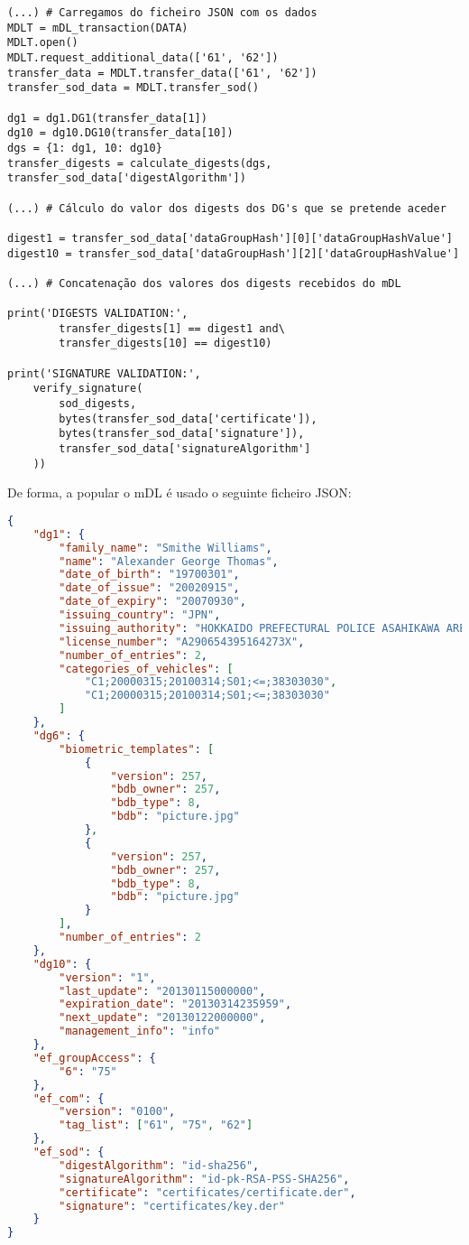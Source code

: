 \begin{Verbatim}[frame=single, framerule=0.5mm]
(...) # Carregamos do ficheiro JSON com os dados
MDLT = mDL_transaction(DATA)
MDLT.open()
MDLT.request_additional_data(['61', '62'])
transfer_data = MDLT.transfer_data(['61', '62'])
transfer_sod_data = MDLT.transfer_sod()

dg1 = dg1.DG1(transfer_data[1])
dg10 = dg10.DG10(transfer_data[10])
dgs = {1: dg1, 10: dg10}
transfer_digests = calculate_digests(dgs, transfer_sod_data['digestAlgorithm'])

(...) # Cálculo do valor dos digests dos DG's que se pretende aceder

digest1 = transfer_sod_data['dataGroupHash'][0]['dataGroupHashValue']
digest10 = transfer_sod_data['dataGroupHash'][2]['dataGroupHashValue']

(...) # Concatenação dos valores dos digests recebidos do mDL

print('DIGESTS VALIDATION:',
        transfer_digests[1] == digest1 and\
        transfer_digests[10] == digest10)

print('SIGNATURE VALIDATION:',
    verify_signature(
        sod_digests,
        bytes(transfer_sod_data['certificate']),
        bytes(transfer_sod_data['signature']),
        transfer_sod_data['signatureAlgorithm']
    ))
\end{Verbatim}

De forma, a popular o mDL é usado o seguinte ficheiro JSON:

\begin{lstlisting}[language=json]
{
    "dg1": {
        "family_name": "Smithe Williams",
        "name": "Alexander George Thomas",
        "date_of_birth": "19700301",
        "date_of_issue": "20020915",
        "date_of_expiry": "20070930",
        "issuing_country": "JPN",
        "issuing_authority": "HOKKAIDO PREFECTURAL POLICE ASAHIKAWA AREA SAFETY PUBLIC",
        "license_number": "A290654395164273X",
        "number_of_entries": 2,
        "categories_of_vehicles": [
            "C1;20000315;20100314;S01;<=;38303030",
            "C1;20000315;20100314;S01;<=;38303030"
        ]
    },
    "dg6": {
        "biometric_templates": [
            {
                "version": 257,
                "bdb_owner": 257,
                "bdb_type": 8,
                "bdb": "picture.jpg"
            },
            {
                "version": 257,
                "bdb_owner": 257,
                "bdb_type": 8,
                "bdb": "picture.jpg"
            }
        ],
        "number_of_entries": 2
    },
    "dg10": {
        "version": "1",
        "last_update": "20130115000000",
        "expiration_date": "20130314235959",
        "next_update": "20130122000000",
        "management_info": "info"
    },
    "ef_groupAccess": {
        "6": "75"
    },
    "ef_com": {
        "version": "0100",
        "tag_list": ["61", "75", "62"]
    },
    "ef_sod": {
        "digestAlgorithm": "id-sha256",
        "signatureAlgorithm": "id-pk-RSA-PSS-SHA256",
        "certificate": "certificates/certificate.der",
        "signature": "certificates/key.der"
    }
}
\end{lstlisting}

